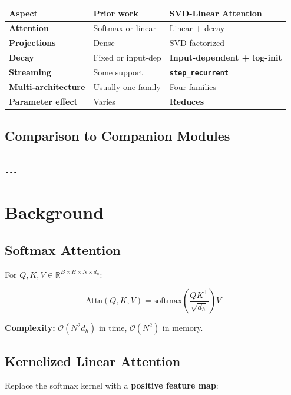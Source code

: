 \begin{table}[H]
\centering
\small
\begin{tabular}{lll}
\toprule
\textbf{Aspect} & \textbf{Prior work} & \textbf{SVD-Linear Attention} \\
\midrule
\textbf{Attention} & Softmax or linear & Linear + decay \\
\textbf{Projections} & Dense & SVD-factorized \\
\textbf{Decay} & Fixed or input-dep & \textbf{Input-dependent + log-init} \\
\textbf{Streaming} & Some support & \textbf{\texttt{step\_recurrent}} \\
\textbf{Multi-architecture} & Usually one family & Four families \\
\textbf{Parameter effect} & Varies & \textbf{Reduces} \\
\bottomrule
\end{tabular}
\end{table}

\subsection{Comparison to Companion Modules}

\begin{lstlisting}

---
\end{lstlisting}


\section{Background}

\subsection{Softmax Attention}

For $Q, K, V \in \mathbb{R}^{B \times H \times N \times d_h}$:

\[
\text{Attn}(Q, K, V) = \text{softmax}\!\left(\frac{Q K^\top}{\sqrt{d_h}}\right) V
\tag{3.1}
\]

\textbf{Complexity:} $\mathcal{O}(N^2 d_h)$ in time, $\mathcal{O}(N^2)$ in memory.

\subsection{Kernelized Linear Attention}

Replace the softmax kernel with a \textbf{positive feature map}:

